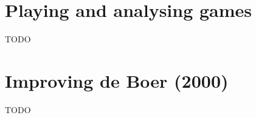 \section{Playing and analysing games}
\label{sec:reimplementing_game_engine}
TODO


\section{Improving de Boer (2000)}
\label{sec:reimplementing_better}
TODO